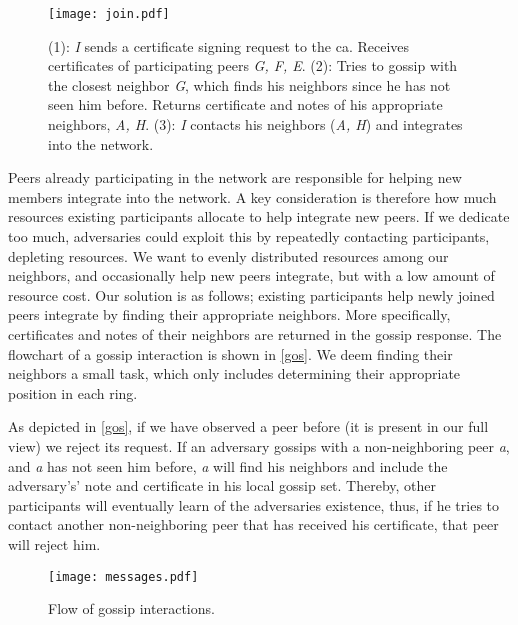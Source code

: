 \documentclass[USenglish]{uit-thesis}
\begin{document}
\begin{figure}[H]
	\centering
	\texttt{[image: join.pdf]}
	\caption[Process of joining a Ifrit network.]{
		(1): \textit{I} sends a certificate signing request to the \gls{ca}. Receives certificates of participating peers \textit{G, F, E}.
		(2): Tries to gossip with the closest neighbor \textit{G}, which finds his neighbors since he has not seen him before. Returns certificate and notes of his appropriate neighbors, \textit{A, H}.
		(3): \textit{I} contacts his neighbors (\textit{A, H}) and integrates into the network.}
	\label{fig:join}
\end{figure} 


Peers already participating in the network are responsible for helping new members integrate into the network.
A key consideration is therefore how much resources existing participants allocate to help integrate new peers.
If we dedicate too much, adversaries could exploit this by repeatedly contacting participants, depleting resources.
We want to evenly distributed resources among our neighbors, and occasionally help new peers integrate, but with a low amount of resource cost.
Our solution is as follows; existing participants help newly joined peers integrate by finding their appropriate neighbors.
More specifically, certificates and notes of their neighbors are returned in the gossip response.    
The flowchart of a gossip interaction is shown in \autoref{gos}.
We deem finding their neighbors a small task, which only includes determining their appropriate position in each ring.

As depicted in \autoref{gos}, if we have observed a peer before (it is present in our full view) we reject its request.
If an adversary gossips with a non-neighboring peer \textit{a}, and \textit{a} has not seen him before, \textit{a} will find his neighbors and include the adversary's' note and certificate in his local gossip set. 
Thereby, other participants will eventually learn of the adversaries existence, thus, if he tries to contact another non-neighboring peer that has received his certificate, that peer will reject him.

\begin{figure}[h]
	\centering
	\texttt{[image: messages.pdf]}
	\caption{Flow of gossip interactions.}
	\label{gos}
\end{figure}
\end{document}
